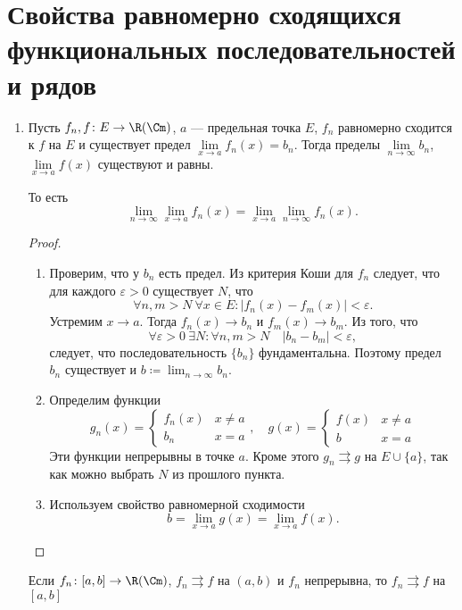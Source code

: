 \section{Свойства равномерно сходящихся функциональных последовательностей и рядов}
	\begin{enumerate}
		\item \label{prop:rsf1} Пусть $ f_n, f\colon E \to \R(\Cm)$, $ a$ --- предельная точка  $ E$,  $ f_n$ равномерно сходится к  $ f$ на $ E$ и существует предел $ \lim\limits_{x \to  a}f_n(x) = b_n$.
			Тогда пределы $ \lim\limits_{n \to  \infty} b_n$, $ \lim\limits_{x \to a} f(x)$ существуют и равны.

			То есть \[
				\lim_{n \to \infty} \lim_{x \to  a} f_n(x) = \lim_{x \to  a} \lim_{n \to \infty} f_n(x)
			.\]
			\begin{proof}
				$ $
				\begin{enumerate}
					\item Проверим, что у $ b_n$ есть предел. Из критерия Коши для $ f_n$ следует, что для каждого  $ \varepsilon >0$ существует $ N$, что
						\[
							\forall n, m > N ~ \forall x \in E \colon \lvert f_n(x) - f_m(x) \rvert < \varepsilon
						.\]
						Устремим $ x \to  a$. Тогда $ f_n(x) \to b_n$ и $ f_m(x) \to b_m$. Из того, что
						\[
							\forall \varepsilon  > 0 ~ \exists N\colon \forall n, m > N \quad \lvert b_n - b_m \rvert < \varepsilon
						,\]
						следует, что  последовательность $ \{b_n\}$ фундаментальна. Поэтому предел  $ b_n$ существует и  $ b\coloneqq \lim_{n \to \infty} b_n $.
					\item Определим функции
						\[
							g_n(x) =
							\begin{cases}
								f_n(x) & x \ne a \\
								b_n & x = a
							\end{cases}
							,
							\quad
							g(x) =
							\begin{cases}
								f(x) & x \ne a \\
								b & x = a
							\end{cases}
						\]
						Эти функции непрерывны в точке $ a$. Кроме этого  $ g_n \rightrightarrows g$ на $ E \cup \{a\}$, так как можно выбрать $ N$ из прошлого пункта.
					\item Используем свойство равномерной сходимости %
						\[
							b = \lim_{x \to  a} g(x) = \lim_{x \to a} f(x)
						.\]
				\end{enumerate}
			\end{proof}
			\begin{cor}
				Если $ f_n \colon [a, b] \to \R(\Cm)$, $ f_n \rightrightarrows f$ на $ (a, b)$ и $ f_n$ непрерывна, то $ f_n \rightrightarrows f$ на $ [a, b]$
			\end{cor}
	\end{enumerate}
